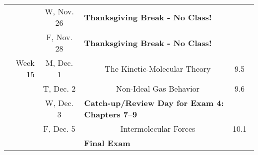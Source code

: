 \begin{tabular}{rcccc}
& W, Nov. 26& \multicolumn{3}{l}{\textbf{Thanksgiving Break - No Class!}}\\
& F, Nov. 28& \multicolumn{3}{l}{\textbf{Thanksgiving Break - No Class!}}\\
\midrule
Week 15 & M, Dec. 1&& The Kinetic-Molecular Theory & 9.5\\
& T, Dec. 2&& Non-Ideal Gas Behavior & 9.6\\
& W, Dec. 3& \multicolumn{3}{l}{\textbf{Catch-up/Review Day for Exam 4: Chapters 7--9}}\\
& F, Dec. 5&& Intermolecular Forces & 10.1\\
\midrule
\midrule
& & \multicolumn{3}{l}{\textbf{Final Exam}}\\
\end{tabular}